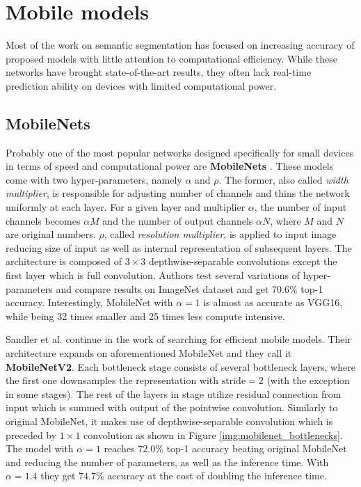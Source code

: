 \section{Mobile models}
\label{sec:mobile_models_related}

Most of the work on semantic segmentation has focused on increasing accuracy of proposed
models with little attention to computational efficiency. While these networks have brought
state-of-the-art results, they often lack real-time prediction ability on devices with
limited computational power.

\subsection{MobileNets}
\label{sec:mobile_models:mobilenet}

Probably one of the most popular networks designed specifically for small devices in terms of
speed and computational power are \textbf{MobileNets} \cite{bib:howard2017mobilenets}.
These models come with two hyper-parameters, namely $\alpha$ and $\rho$. The former, also
called \textit{width multiplier}, is responsible for adjusting number of channels and
thins the network uniformly at each layer. For a given layer and multiplier $\alpha$,
the number of input channels becomes $\alpha M$ and the number of output channels
$\alpha N$, where $M$ and $N$ are original numbers. $\rho$, called 
\textit{resolution multiplier},
is applied to input image reducing size of input as well as internal representation
of subsequent layers. The architecture is composed of $3\times 3$
depthwise-separable convolutions except the first layer which is full convolution.
Authors test several variations of hyper-parameters and compare results on ImageNet dataset
and get $70.6\%$ top-1 accuracy.
Interestingly, MobileNet with $\alpha=1$ is almost as accurate as VGG16, while
being 32 times smaller and 25 times less compute intensive.

\vspace{5mm}
Sandler et al. \cite{bib:sandler2018mobilenetv2} continue in the work of searching for
efficient mobile models. Their architecture expands on aforementioned MobileNet and
they call it \textbf{MobileNetV2}. Each bottleneck stage consists of several bottleneck
layers, where the first one downsamples the representation with
$\textrm{stride}=2$ (with the exception in some stages). The rest of the layers in stage
utilize residual connection from input which is summed with output of the
pointwise convolution. Similarly to original MobileNet, it makes use of depthwise-separable
convolution which is preceded by $1\times 1$ convolution as shown in Figure
\ref{img:mobilenet_bottlenecks}. The model with $\alpha=1$ reaches
$72.0\%$ top-1 accuracy beating original MobileNet and reducing the number of parameters, as well
as the inference time. With $\alpha=1.4$ they get $74.7\%$ accuracy at the cost of
doubling the inference time.

